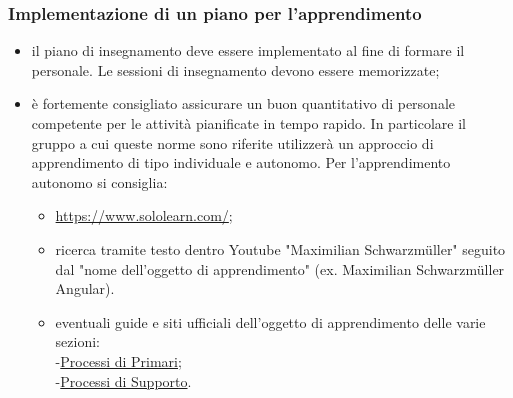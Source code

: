 \subsubsection{Implementazione di un piano per l'apprendimento}
\begin{itemize}
    \item il piano di insegnamento deve essere implementato al fine di formare il personale. Le sessioni di insegnamento devono essere memorizzate;
    \item è fortemente consigliato assicurare un buon quantitativo di personale competente per le attività pianificate in tempo rapido.
    In particolare il gruppo a cui queste norme sono riferite utilizzerà un approccio di apprendimento di tipo individuale e autonomo. Per l'apprendimento autonomo si consiglia:
    \begin{itemize}
        \item \url{https://www.sololearn.com/};
        \item ricerca tramite testo dentro Youtube "Maximilian Schwarzmüller" seguito dal "nome dell'oggetto di apprendimento" (ex. Maximilian Schwarzmüller Angular).
        \item eventuali guide e siti ufficiali dell'oggetto di apprendimento delle varie sezioni:\\
        \hypersetup{
            linkcolor=blue
        }
        -\hyperlink{ProcessiPrimari}{Processi di Primari};\\
        -\hyperlink{ProcessiSupporto}{Processi di Supporto}.
    \end{itemize}
\end{itemize}


